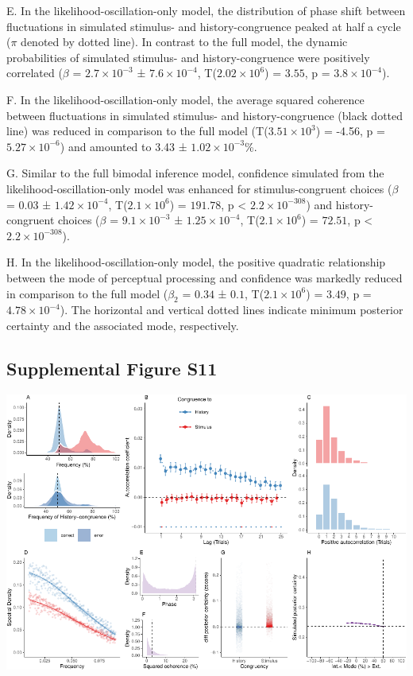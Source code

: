 \documentclass[
]{article}
\begin{document}
E. In the likelihood-oscillation-only model, the distribution of phase
shift between fluctuations in simulated stimulus- and history-congruence
peaked at half a cycle (\(\pi\) denoted by dotted line). In contrast to
the full model, the dynamic probabilities of simulated stimulus- and
history-congruence were positively correlated (\(\beta\) =
\(\ensuremath{2.7\times 10^{-3}}\) ± \(\ensuremath{7.6\times 10^{-4}}\),
T(\(\ensuremath{2.02\times 10^{6}}\)) = \(3.55\), p =
\(\ensuremath{3.8\times 10^{-4}}\)).

F. In the likelihood-oscillation-only model, the average squared
coherence between fluctuations in simulated stimulus- and
history-congruence (black dotted line) was reduced in comparison to the
full model (T(\ensuremath{3.51\times 10^{3}}) = -4.56, p =
\(\ensuremath{5.27\times 10^{-6}}\)) and amounted to 3.43 ±
\ensuremath{1.02\times 10^{-3}}\%.

G. Similar to the full bimodal inference model, confidence simulated
from the likelihood-oscillation-only model was enhanced for
stimulus-congruent choices (\(\beta\) = \(0.03\) ±
\(\ensuremath{1.42\times 10^{-4}}\),
T(\(\ensuremath{2.1\times 10^{6}}\)) = \(191.78\), p < \(\ensuremath{2.2\times 10^{-308}}\)) and
history-congruent choices (\(\beta\) =
\(\ensuremath{9.1\times 10^{-3}}\) ±
\(\ensuremath{1.25\times 10^{-4}}\),
T(\(\ensuremath{2.1\times 10^{6}}\)) = \(72.51\), p < \(\ensuremath{2.2\times 10^{-308}}\)).

H. In the likelihood-oscillation-only model, the positive quadratic
relationship between the mode of perceptual processing and confidence
was markedly reduced in comparison to the full model (\(\beta_2\) =
\(0.34\) ± \(0.1\), T(\(\ensuremath{2.1\times 10^{6}}\)) = \(3.49\), p =
\(\ensuremath{4.78\times 10^{-4}}\)). The horizontal and vertical dotted
lines indicate minimum posterior certainty and the associated mode,
respectively.

\newpage

\hypertarget{supplemental-figure-s11}{%
\subsection{Supplemental Figure S11}\label{supplemental-figure-s11}}

\includegraphics{modes_mouse_rev1b_files/figure-latex/Supplemental_Figure_S11-1.pdf}
\end{document}
